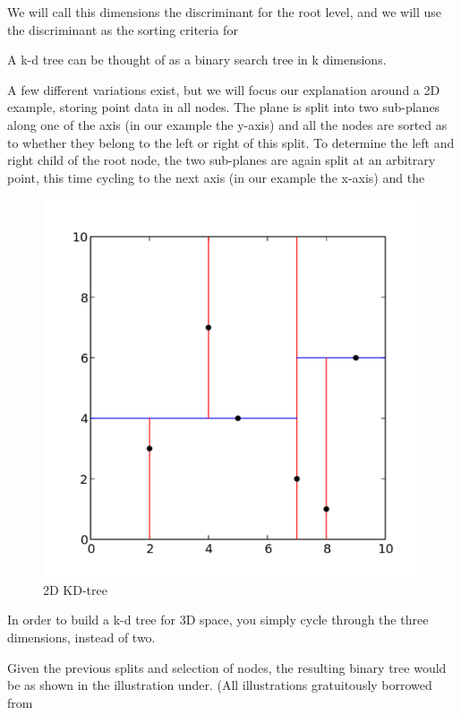 We will call this dimensions the discriminant for the root level, and we will use the discriminant as the sorting criteria for 


A k-d tree can be thought of as a binary search tree in k dimensions.

A few different variations exist, but we will focus our explanation around a 2D example, storing point data in all nodes. The plane is split into two sub-planes along one of the axis (in our example the y-axis) and all the nodes are sorted as to whether they belong to the left or right of this split. To determine the left and right child of the root node, the two sub-planes are again split at an arbitrary point, this time cycling to the next axis (in our example the x-axis) and the

\begin{figure}[ht!]
\centering
\includegraphics[width=120mm]{../gfx/Kdtree_2d.png}

\caption{2D KD-tree}
\label{fig:kdtree_2d}
\end{figure}

In order to build a k-d tree for 3D space, you simply cycle through the three dimensions, instead of two.

Given the previous splits and selection of nodes, the resulting binary tree would be as shown in the illustration under. (All illustrations gratuitously borrowed from

